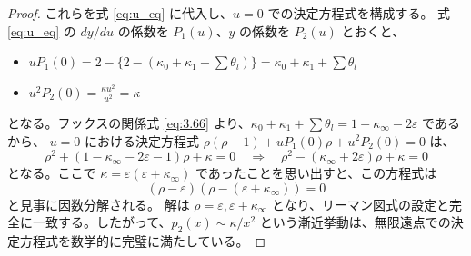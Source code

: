 \begin{Q}[【計算の検証】$x \to \infty$ における $p_2(x) \sim \kappa/x^2$ という振る舞いは、座標変換 $x=1/u$ を経た後の $u=0$ での決定方程式を正しく満たしているか？]
\begin{proof}
これらを式 \eqref{eq:u_eq} に代入し、$u=0$ での決定方程式を構成する。
式 \eqref{eq:u_eq} の $dy/du$ の係数を $P_1(u)$、$y$ の係数を $P_2(u)$ とおくと、
\begin{itemize}
    \item $u P_1(0) = 2 - \{2 - (\kappa_0 + \kappa_1 + \sum \theta_l)\} = \kappa_0 + \kappa_1 + \sum \theta_l$
    \item $u^2 P_2(0) = \frac{\kappa u^2}{u^2} = \kappa$
\end{itemize}
となる。フックスの関係式 \eqref{eq:3.66} より、$\kappa_0 + \kappa_1 + \sum \theta_l = 1 - \kappa_\infty - 2\varepsilon$ であるから、
$u=0$ における決定方程式 $\rho(\rho-1) + uP_1(0)\rho + u^2P_2(0) = 0$ は、
\begin{equation*}
\rho^2 + (1 - \kappa_\infty - 2\varepsilon - 1)\rho + \kappa = 0 \quad \Longrightarrow \quad \rho^2 - (\kappa_\infty + 2\varepsilon)\rho + \kappa = 0
\end{equation*}
となる。ここで $\kappa = \varepsilon(\varepsilon + \kappa_\infty)$ であったことを思い出すと、この方程式は
\begin{equation*}
(\rho - \varepsilon)(\rho - (\varepsilon + \kappa_\infty)) = 0
\end{equation*}
と見事に因数分解される。
解は $\rho = \varepsilon, \varepsilon + \kappa_\infty$ となり、リーマン図式の設定と完全に一致する。したがって、$p_2(x) \sim \kappa/x^2$ という漸近挙動は、無限遠点での決定方程式を数学的に完璧に満たしている。
\end{proof}
\end{Q}

